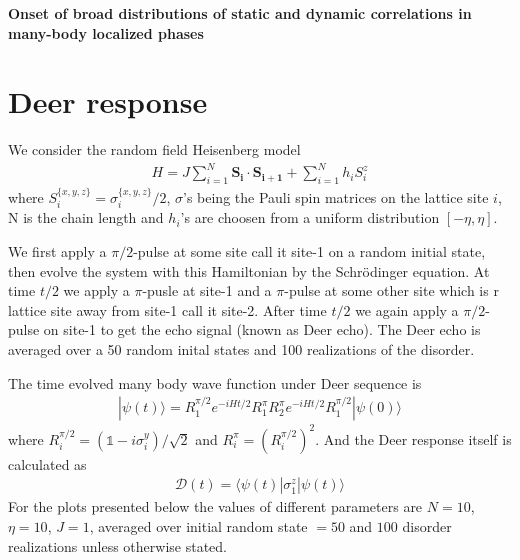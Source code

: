 \documentclass[a4paper]{article}
\begin{document}
\begin{titlepage}
\newcommand{\HRule}{\rule{\linewidth}{0.5mm}} 

\center

{ \huge \bfseries Onset of broad distributions of static and dynamic correlations in many-body localized phases}\\[0.4cm] 

\vfill

\end{titlepage}


\tableofcontents
\newpage
\listoffigures

\newpage
\section{Deer response}
We consider the random field Heisenberg model
\begin{eqnarray}
H = J\sum_{i=1}^{N} \mathbf{S_i \cdot S_{i+1}} + \sum_{i=1}^{N} h_i S_i^z
\end{eqnarray}
where $S_i^{\{x,y,z\}}=\sigma_i^{\{x,y,z\}}/2$, $\sigma$'s being the Pauli spin matrices on the lattice site $i$, N is the chain length and $h_i$'s are choosen from a uniform distribution $[-\eta,\eta]$.

We first apply a $\pi/2$-pulse at some site call it site-1 on a random initial state, then evolve the system with this Hamiltonian by the Schr\"odinger equation. At time $t/2$ we apply a $\pi$-pusle at site-1 and a $\pi$-pulse at some other site which is r lattice site away from site-1 call it site-2. After time $t/2$ we again apply a $\pi/2$-pulse on site-1 to get the echo signal (known as Deer echo). The Deer echo is averaged over a 50 random inital states and 100 realizations of the disorder.

The time evolved many body wave function under Deer sequence is
\begin{eqnarray}
|\psi(t)\rangle = R_1^{\pi/2} e^{-iHt/2} R_1^{\pi} R_2^{\pi} e^{-iHt/2} R_1^{\pi/2} |\psi(0)\rangle 
\end{eqnarray}
where $R_i^{\pi/2} = (\mathds{1}-i\sigma_i^y)/\sqrt 2$ and $R_i^{\pi} = (R_i^{\pi/2})^2$. And the Deer response itself is calculated as 
\begin{eqnarray}
\mathcal{D}(t) = \langle \psi(t) | \sigma_1^z | \psi(t) \rangle 
\end{eqnarray}
For the plots presented below the values of different parameters are $N=10$, $\eta=10$, $J=1$, averaged over initial random state $=50$ and $100$ disorder realizations unless otherwise stated.
\end{document}
